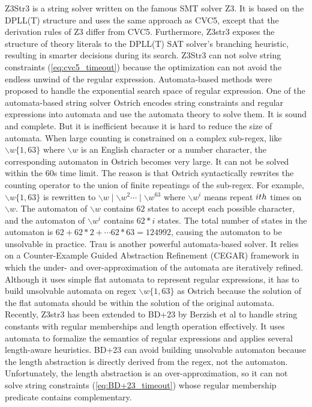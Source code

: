 {Z3Str3\cite{z3str3} is a string solver written on the famous SMT solver Z3\cite{Z3}. It is based on the DPLL(T) structure and uses the same approach as CVC5, except that the derivation rules of Z3 differ from CVC5. Furthermore, Z3str3 exposes the structure of theory literals to the DPLL(T) SAT solver's branching heuristic, resulting in smarter decisions during its search. Z3Str3 can not solve string constraints (\ref{eq:cvc5_timeout}) because the optimization can not avoid the endless unwind of the regular expression. Automata-based methods were proposed to handle the exponential search space of regular expression. One of the automata-based string solver Ostrich\cite{ostrich}\cite{atva2020} encodes string constraints and regular expressions into automata and use the automata theory to solve them. It is sound and complete. But it is inefficient because it is hard to reduce the size of automata. When large counting is constrained on a complex sub-regex, like $ \backslash w \{1, 63\}$ where $\backslash w$ is an English character or a number character, the corresponding automaton in Ostrich becomes very large. It can not be solved within the 60s time limit. The reason is that Ostrich syntactically rewrites the counting operator to the union of finite repeatings of the sub-regex. For example, $\backslash w\{1, 63\}$ is rewritten to $\backslash w\mid\backslash w^2\cdots\mid\backslash w^{63}$ where $\backslash w^i$ means repeat $i\-th$ times on $\backslash w$. The automaton of $\backslash w$ contains $62$ states to accept each possible character, and the automaton of $\backslash w ^i$ contains $62*i$ states. The total number of states in the automaton is $62 + 62*2 + \cdots 62*63=124992$, causing the automaton to be unsolvable in practice. Trau\cite{z3trau}\cite{trau+} is another powerful automata-based solver. It relies on a Counter-Example Guided Abstraction Refinement (CEGAR) framework in which the under- and over-approximation of the automata are iteratively refined. Although it uses simple flat automata to represent regular expressions, it has to build unsolvable automata on regex $\backslash w\{1, 63\}$ as Ostrich because the solution of the flat automata should be within the solution of the original automata. 
Recently, Z3str3 has been extended to BD+23\cite{BD+23} by Berzish et al to handle string constants with regular memberships and length operation effectively. It uses automata to formalize the semantics of regular expressions and applies several length-aware heuristics. BD+23 can avoid building unsolvable automaton because the length abstraction is directly derived from the regex, not the automaton. Unfortunately, the length abstraction is an over-approximation, so it can not solve string constraints (\ref{eq:BD+23_timeout}) whose regular membership predicate contains complementary.
}
